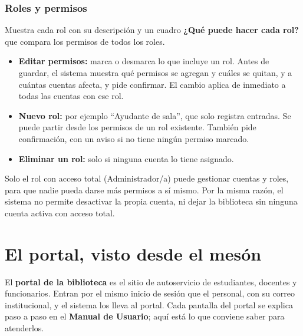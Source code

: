 \documentclass[11pt,a4paper]{report}
\begin{document}
\subsection{Roles y permisos}

Muestra cada rol con su descripción y un cuadro \textbf{¿Qué puede hacer
cada rol?} que compara los permisos de todos los roles.


\begin{itemize}
  \item \textbf{Editar permisos:} marca o desmarca lo que incluye un rol.
  Antes de guardar, el sistema muestra qué permisos se agregan y cuáles
  se quitan, y a cuántas cuentas afecta, y pide confirmar. El cambio
  aplica de inmediato a todas las cuentas con ese rol.
  \item \textbf{Nuevo rol:} por ejemplo ``Ayudante de sala'', que solo
  registra entradas. Se puede partir desde los permisos de un rol
  existente. También pide confirmación, con un aviso si no tiene ningún
  permiso marcado.
  \item \textbf{Eliminar un rol:} solo si ninguna cuenta lo tiene
  asignado.
\end{itemize}

\begin{importante}
Solo el rol con acceso total (Administrador/a) puede gestionar cuentas y
roles, para que nadie pueda darse más permisos a sí mismo. Por la misma
razón, el sistema no permite desactivar la propia cuenta, ni dejar la
biblioteca sin ninguna cuenta activa con acceso total.
\end{importante}

\chapter{El portal, visto desde el mesón}
\label{cap:portal}

El \textbf{portal de la biblioteca} es el sitio de autoservicio de
estudiantes, docentes y funcionarios. Entran por el mismo inicio de sesión
que el personal, con su correo institucional, y el sistema los lleva al
portal. Cada pantalla del portal se explica paso a paso en el
\textbf{Manual de Usuario}; aquí está lo que conviene saber para
atenderlos.
\end{document}
